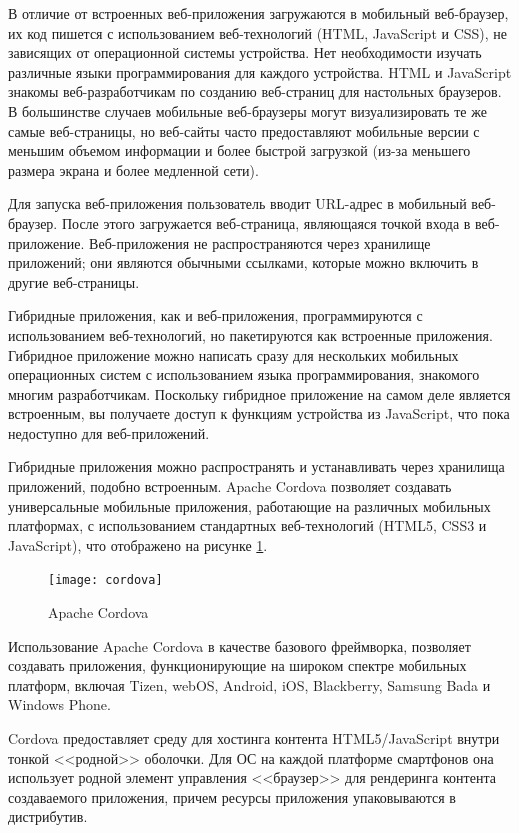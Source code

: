 В отличие от встроенных веб-приложения загружаются в мобильный веб-браузер, их код пишется с использованием веб-технологий (HTML, JavaScript и CSS), не зависящих от операционной системы устройства. Нет необходимости изучать различные языки программирования для каждого устройства. HTML и JavaScript знакомы веб-разработчикам по созданию веб-страниц для настольных браузеров. В большинстве случаев мобильные веб-браузеры могут визуализировать те же самые веб-страницы, но веб-сайты часто предоставляют мобильные версии с меньшим объемом информации и более быстрой загрузкой (из-за меньшего размера экрана и более медленной сети).

Для запуска веб-приложения пользователь вводит URL-адрес в мобильный веб-браузер. После этого загружается веб-страница, являющаяся точкой входа в веб-приложение. Веб-приложения не распространяются через хранилище приложений; они являются обычными ссылками, которые можно включить в другие веб-страницы.

Гибридные приложения, как и веб-приложения, программируются с использованием веб-технологий, но пакетируются как встроенные приложения. Гибридное приложение можно написать сразу для нескольких мобильных операционных систем с использованием языка программирования, знакомого многим разработчикам. Поскольку гибридное приложение на самом деле является встроенным, вы получаете доступ к функциям устройства из JavaScript, что пока недоступно для веб-приложений.

Гибридные приложения можно распространять и устанавливать через хранилища приложений, подобно встроенным. Apache Cordova позволяет создавать универсальные мобильные приложения, работающие на различных мобильных платформах, с использованием стандартных веб-технологий (HTML5, CSS3 и JavaScript), что отображено на рисунке \ref{cordova}.

\begin{figure}[ht]
\center\texttt{[image: cordova]}
\caption{Apache Cordova}\label{cordova}
\end{figure}

Использование Apache Cordova в качестве базового фреймворка, позволяет создавать приложения, функционирующие на широком спектре мобильных платформ, включая Tizen, webOS, Android, iOS, Blackberry, Samsung Bada и Windows Phone\cite{cordova}.

Cordova предоставляет среду для хостинга контента HTML5/JavaScript внутри тонкой <<родной>> оболочки. Для ОС на каждой платформе смартфонов она использует родной элемент управления <<браузер>> для рендеринга контента создаваемого приложения, причем ресурсы приложения упаковываются в дистрибутив.

